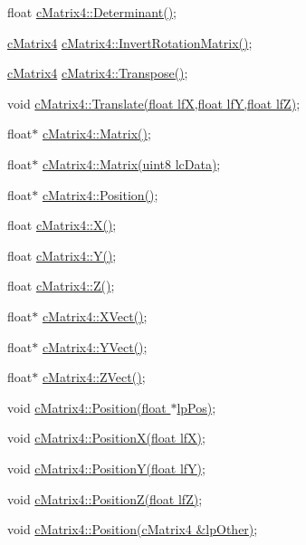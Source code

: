  float \hyperlink{classc_matrix4_a39cf7cefa0672684e69eb4af89366270}{cMatrix4::Determinant()}; \par
 \hyperlink{classc_matrix4}{cMatrix4} \hyperlink{classc_matrix4_a7473299a57ffcfe284e6fd9005b98592}{cMatrix4::InvertRotationMatrix()}; \par
 \hyperlink{classc_matrix4}{cMatrix4} \hyperlink{classc_matrix4_ac8b6f1a9352943cd86ef4c088c438307}{cMatrix4::Transpose()}; \par
 void \hyperlink{classc_matrix4_af728db2d340a48de20d9f9e143e3a19b}{cMatrix4::Translate(float lfX,float lfY,float lfZ)}; \par
 \par
 float$\ast$ \hyperlink{classc_matrix4_a8697973a28e45b0866cce4cdba2e216d}{cMatrix4::Matrix()}; \par
 float$\ast$ \hyperlink{classc_matrix4_a1e70788aed256a22cf62b11a12e0db74}{cMatrix4::Matrix(uint8 lcData)}; \par
 float$\ast$ \hyperlink{classc_matrix4_a7b0917b0f0a69d73ed41d05fd37d52ac}{cMatrix4::Position()}; \par
 float \hyperlink{classc_matrix4_aff5d7d1cf3cf0b9ddb9e55e2f799012f}{cMatrix4::X()}; \par
 float \hyperlink{classc_matrix4_aa22f36646d19566a438a297cb9a9bfb5}{cMatrix4::Y()}; \par
 float \hyperlink{classc_matrix4_a8b62f500f8194b06dab12e85e57fd9ef}{cMatrix4::Z()}; \par
 float$\ast$ \hyperlink{classc_matrix4_a958689f28a118eac91104f5a847ac0fd}{cMatrix4::XVect()}; \par
 float$\ast$ \hyperlink{classc_matrix4_acff0242ac76b2ccd854eeec0d4913abe}{cMatrix4::YVect()}; \par
 float$\ast$ \hyperlink{classc_matrix4_ab3d5e1a9ca6652c84265d4d164494699}{cMatrix4::ZVect()}; \par
 \par
 void \hyperlink{classc_matrix4_ae3bb670db30cee45d59aef1599289086}{cMatrix4::Position(float $\ast$lpPos)}; \par
 void \hyperlink{classc_matrix4_adf27db7265e42ccbbb5a6779800c39ea}{cMatrix4::PositionX(float lfX)}; \par
 void \hyperlink{classc_matrix4_a4f7469486d7557e158ebc70a261c853c}{cMatrix4::PositionY(float lfY)}; \par
 void \hyperlink{classc_matrix4_a6baf253feb5e27b5e3e81971d9f5d718}{cMatrix4::PositionZ(float lfZ)}; \par
 void \hyperlink{classc_matrix4_a79457e17d6ab9a0c5db16c94405be35c}{cMatrix4::Position(cMatrix4 \&lpOther)}; \par
